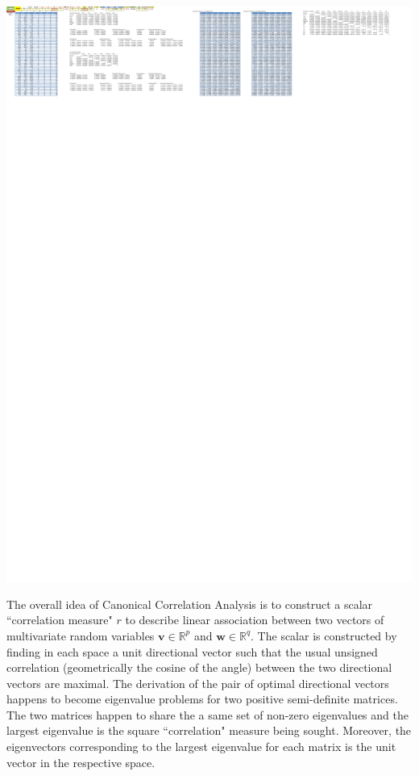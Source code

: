 \documentclass[article]{jss}
\begin{document}
        \begin{center}
          \includegraphics[width=\linewidth,keepaspectratio=true]{img/CanCorrSheetOutput}
        \end{center}
        The overall idea of Canonical Correlation \cite{hotelling1936relations} Analysis is to construct a scalar ``correlation measure" $r$ to describe linear association between two vectors of multivariate random variables $\textbf{v}\in\mathbb{R}^p$ and $\textbf{w}\in\mathbb{R}^q$. The scalar is constructed by finding in each space a unit directional vector such that the usual unsigned correlation (geometrically the cosine of the angle) between the two directional vectors are maximal. The derivation of the pair of optimal directional vectors happens to become eigenvalue problems for two positive semi-definite matrices. The two matrices happen to share the a same set of non-zero eigenvalues and the largest eigenvalue is the square ``correlation" measure being sought. Moreover, the eigenvectors corresponding to the largest eigenvalue for each matrix is the unit vector in the respective space.
\end{document}
